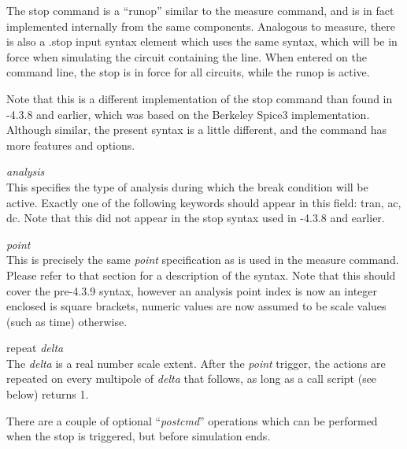 The {\cb stop} command is a ``runop'' similar to the {\cb measure}
command, and is in fact implemented internally from the same
components.  Analogous to {\cb measure}, there is also a {\vt .stop}
input syntax element which uses the same syntax, which will be in
force when simulating the circuit containing the line.  When entered
on the command line, the stop is in force for all circuits, while the
runop is active.

Note that this is a different implementation of the {\cb stop} command
than found in {\WRspice}-4.3.8 and earlier, which was based on the
Berkeley Spice3 implementation.  Although similar, the present syntax
is a little different, and the command has more features and options. 

\begin{description}
\item{\it analysis}\\
This specifies the type of analysis during which the break condition
will be active.  Exactly one of the following keywords should appear
in this field:  {\vt tran}, {\vt ac}, {\vt dc}.  Note that this did
not appear in the {\cb stop} syntax used in {\WRspice}-4.3.8 and
earlier.

\item{\it point}\\
This is precisely the same {\it point} specification as is used in the
{\cb measure} command.  Please refer to that section for a description
of the syntax.  Note that this should cover the pre-4.3.9 syntax,
however an analysis point index is now an integer enclosed is square
brackets, numeric values are now assumed to be scale values (such as
time) otherwise.

\item{\vt repeat} {\it delta}\\
The {\it delta} is a real number scale extent.  After the {\it point}
trigger, the actions are repeated on every multipole of {\it delta}
that follows, as long as a {\vt call} script (see below) returns 1.
\end{description}

There are a couple of optional ``{\it postcmd}'' operations which can
be performed when the stop is triggered, but before simulation ends.

